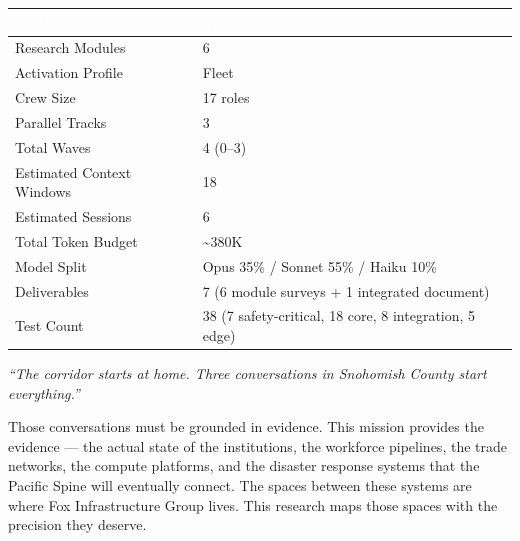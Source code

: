 \documentclass[11pt,letterpaper]{article}
\newcommand{\tableheader}[1]{\textbf{\sffamily\textcolor{white}{#1}}}
\begin{document}
\begin{center}
\begin{tabularx}{\textwidth}{L{5cm}X}
\toprule
{}
\tableheader{Metric} & \tableheader{Value} \\
\midrule
Research Modules & 6 \\
Activation Profile & Fleet \\
Crew Size & 17 roles \\
Parallel Tracks & 3 \\
Total Waves & 4 (0--3) \\
Estimated Context Windows & 18 \\
Estimated Sessions & 6 \\
Total Token Budget & \textasciitilde380K \\
Model Split & Opus 35\% / Sonnet 55\% / Haiku 10\% \\
Deliverables & 7 (6 module surveys + 1 integrated document) \\
Test Count & 38 (7 safety-critical, 18 core, 8 integration, 5 edge) \\
\bottomrule
\end{tabularx}
\end{center}

\vspace{1em}
\begin{quotebox}
\textit{``The corridor starts at home. Three conversations in Snohomish County start everything.''}

\vspace{0.5em}

Those conversations must be grounded in evidence. This mission provides the evidence --- the actual state of the institutions, the workforce pipelines, the trade networks, the compute platforms, and the disaster response systems that the Pacific Spine will eventually connect. The spaces between these systems are where Fox Infrastructure Group lives. This research maps those spaces with the precision they deserve.
\end{quotebox}
\end{document}
